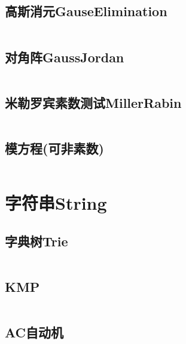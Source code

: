 \documentclass[twoside,sub3section,UTF8]{ctexart}						%
\begin{document}
	\subsection{高斯消元GauseElimination}
		\inputminted{c++}{"Maths/GaussElimination.cpp"}
	\subsection{对角阵GaussJordan}
		\inputminted{c++}{"Maths/GaussJordan.cpp"}
	\subsection{米勒罗宾素数测试MillerRabin}
		\inputminted{c++}{"Maths/MillerRabin.cpp"}
	\subsection{模方程(可非素数)}
		\inputminted{c++}{"Maths/模方程（可非素数）.cpp"}


\section{字符串String}
	\subsection{字典树Trie}
		\inputminted{c++}{"String/Trie.cpp"}
	\subsection{KMP}
		\inputminted{c++}{"String/KMP.cpp"}
	\subsection{AC自动机}
		\inputminted{c++}{"String/AC.cpp"}
\end{document}
